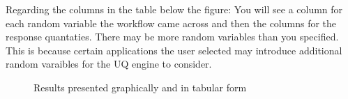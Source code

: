 Regarding the columns in the table below the figure: You will see a column for each random variable the workflow came across and then the columns for the response quantaties. There may be more random variables than you specified. This is because certain applications the user selected may introduce additional random varaibles for the UQ engine to consider. 

\begin{figure}[!htbp]
  \caption{Results presented graphically and in tabular form}
  \label{fig:results_data}
\end{figure}

